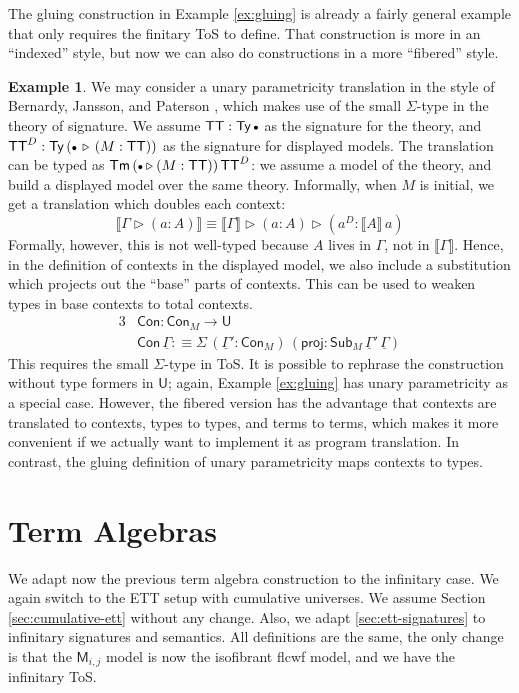 \documentclass[12pt,a4paper,twoside,openany]{book}
\theoremstyle{remark}
\theoremstyle{definition}
\newtheorem{myexample}{Example}
\theoremstyle{theorem}
\newcommand{\ms}[1]{\mathsf{#1}}
\newcommand{\bs}[1]{\boldsymbol{#1}}
\newcommand{\Con}{\mathsf{Con}}
\newcommand{\Sub}{\mathsf{Sub}}
\newcommand{\Tm}{\mathsf{Tm}}
\newcommand{\Ty}{\mathsf{Ty}}
\newcommand{\U}{\mathsf{U}}
\newcommand{\proj}{\mathsf{proj}}
\newcommand{\ext}{\triangleright}
\newcommand{\emptycon}{\scaleobj{.75}\bullet}
\newcommand{\bM}{\bs{\mathsf{M}}}
\newcommand{\ul}[1]{\underline{#1}}
\newcommand{\ulGamma}{\ul{\Gamma}}
\newcommand{\llb}{\llbracket}
\newcommand{\rrb}{\rrbracket}
\newcommand{\sem}[1]{\llb#1\rrb}
\newcommand{\defn}{:\equiv}
\begin{document}
The gluing construction in Example \ref{ex:gluing} is already a fairly general
example that only requires the finitary ToS to define. That construction is more
in an ``indexed'' style, but now we can also do constructions in a more
``fibered'' style.

\begin{myexample}
We may consider a unary parametricity translation in the style of Bernardy,
Jansson, and Paterson \cite{bernardy12parametricity}, which makes use of the
small $\Sigma$-type in the theory of signature. We assume $\ms{TT} :
\Ty\,\emptycon$ as the signature for the theory, and $\ms{TT}^D :
\Ty\,(\emptycon\,\ext\,(M : \ms{TT}))$ as the signature for displayed models.
The translation can be typed as $\Tm\,(\emptycon\ext (M : \ms{TT}))\,\ms{TT}^D$:
we assume a model of the theory, and build a displayed model over the same
theory. Informally, when $M$ is initial, we get a translation which doubles each
context:
\[
  \sem{\Gamma \ext (a : A)} \equiv \sem{\Gamma} \ext (a : A) \ext (a^D : \sem{A}\,a)
\]
Formally, however, this is not well-typed because $A$ lives in $\Gamma$, not in
$\sem{\Gamma}$. Hence, in the definition of contexts in the displayed model, we
also include a substitution which projects out the ``base'' parts of contexts.
This can be used to weaken types in base contexts to total contexts.
\begin{alignat*}{3}
  &\Con : \Con_{M} \to \U\\
  &\Con\,\ulGamma \defn \Sigma\,(\ulGamma' : \Con_M)\,(\proj : \Sub_M\,\ulGamma'\,\ulGamma)
\end{alignat*}
This requires the small $\Sigma$-type in ToS. It is possible to rephrase the
construction without type formers in $\U$; again, Example \ref{ex:gluing} has unary
parametricity as a special case. However, the fibered version has the advantage
that contexts are translated to contexts, types to types, and terms to terms,
which makes it more convenient if we actually want to implement it as program
translation. In contrast, the gluing definition of unary parametricity maps
contexts to types.
\end{myexample}


\section{Term Algebras}
\label{sec:inf-term-algebras}

We adapt now the previous term algebra construction to the infinitary
case. We again switch to the ETT setup with cumulative universes. We
assume Section \ref{sec:cumulative-ett} without any change. Also, we adapt
\ref{sec:ett-signatures} to infinitary signatures and semantics. All definitions
are the same, the only change is that the $\bM_{i,j}$ model is now the
isofibrant flcwf model, and we have the infinitary ToS.
\end{document}

